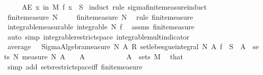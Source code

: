 \begin{isabellebody}
\ \ \ \ \ {\isachardoublequoteopen}AE\ x\ in\ M{\isachardot}{\kern0pt}\ f\ x\ {\isasymin}\ S{\isachardoublequoteclose}\isanewline
%
\isadelimproof
%
\endisadelimproof
%
\isatagproof
{}\isamarkupfalse%
\ {\isacharparenleft}{\kern0pt}induct\ rule{\isacharcolon}{\kern0pt}\ sigma{\isacharunderscore}{\kern0pt}finite{\isacharunderscore}{\kern0pt}measure{\isacharunderscore}{\kern0pt}induct{\isacharparenright}{\kern0pt}\isanewline
\ \ \isamarkupfalse%
\ {\isacharparenleft}{\kern0pt}finite{\isacharunderscore}{\kern0pt}measure\ N\ {\isasymOmega}{\isacharparenright}{\kern0pt}\isanewline
\isanewline
\ \ \isamarkupfalse%
\ finite{\isacharunderscore}{\kern0pt}measure\ N\ \isamarkupfalse%
\ {\isacharparenleft}{\kern0pt}rule\ finite{\isacharunderscore}{\kern0pt}measure{\isacharparenright}{\kern0pt}\isanewline
\ \ \isanewline
\ \ \isamarkupfalse%
\ integrable{\isacharbrackleft}{\kern0pt}measurable{\isacharbrackright}{\kern0pt}{\isacharcolon}{\kern0pt}\ {\isachardoublequoteopen}integrable\ N\ f{\isachardoublequoteclose}\ \isamarkupfalse%
\ assms\ finite{\isacharunderscore}{\kern0pt}measure\ \isamarkupfalse%
\ {\isacharparenleft}{\kern0pt}auto\ simp{\isacharcolon}{\kern0pt}\ integrable{\isacharunderscore}{\kern0pt}restrict{\isacharunderscore}{\kern0pt}space\ integrable{\isacharunderscore}{\kern0pt}mult{\isacharunderscore}{\kern0pt}indicator{\isacharparenright}{\kern0pt}\isanewline
\ \ \isamarkupfalse%
\ average{\isacharcolon}{\kern0pt}\ {\isachardoublequoteopen}{\isacharparenleft}{\kern0pt}{}\ {\isacharslash}{\kern0pt}\ Sigma{\isacharunderscore}{\kern0pt}Algebra{\isachardot}{\kern0pt}measure\ N\ A{\isacharparenright}{\kern0pt}\ {\isacharasterisk}{\kern0pt}\isactrlsub R\ set{\isacharunderscore}{\kern0pt}lebesgue{\isacharunderscore}{\kern0pt}integral\ N\ A\ f\ {\isasymin}\ S{\isachardoublequoteclose}\ \ {\isachardoublequoteopen}A\ {\isasymin}\ sets\ N{\isachardoublequoteclose}\ {\isachardoublequoteopen}measure\ N\ A\ {\isachargreater}{\kern0pt}\ {}{\isachardoublequoteclose}\ \ A\isanewline
\ \ \isamarkupfalse%
\ {\isacharminus}{\kern0pt}\isanewline
\ \ \ \ \isamarkupfalse%
\ {\isacharasterisk}{\kern0pt}{\isacharcolon}{\kern0pt}\ {\isachardoublequoteopen}A\ {\isasymin}\ sets\ M{\isachardoublequoteclose}\ \isamarkupfalse%
\ that\ \isamarkupfalse%
\ {\isacharparenleft}{\kern0pt}simp\ add{\isacharcolon}{\kern0pt}\ sets{\isacharunderscore}{\kern0pt}restrict{\isacharunderscore}{\kern0pt}space{\isacharunderscore}{\kern0pt}iff\ finite{\isacharunderscore}{\kern0pt}measure{\isacharparenright}{\kern0pt}\isanewline

\end{isabellebody}

